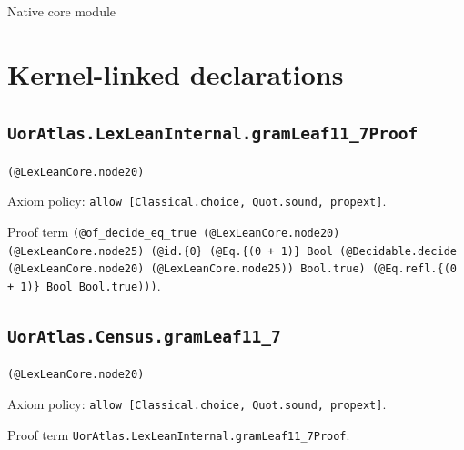 \documentclass[11pt]{article}
\begin{document}
\begin{center}{\LARGE Native core module}\end{center}
\section*{Kernel-linked declarations}
\subsection*{\texttt{UorAtlas.LexLeanInternal.gramLeaf11\_7Proof}}
\noindent\texttt{(@LexLeanCore.node20)}\par
\noindent Axiom policy: \texttt{allow [Classical.choice, Quot.sound, propext]}.\par
\noindent Proof term \texttt{(@of\_decide\_eq\_true (@LexLeanCore.node20) (@LexLeanCore.node25) (@id.\{0\} (@Eq.\{(0 + 1)\} Bool (@Decidable.decide (@LexLeanCore.node20) (@LexLeanCore.node25)) Bool.true) (@Eq.refl.\{(0 + 1)\} Bool Bool.true)))}.\par
\subsection*{\texttt{UorAtlas.Census.gramLeaf11\_7}}
\noindent\texttt{(@LexLeanCore.node20)}\par
\noindent Axiom policy: \texttt{allow [Classical.choice, Quot.sound, propext]}.\par
\noindent Proof term \texttt{UorAtlas.LexLeanInternal.gramLeaf11\_7Proof}.\par
\end{document}
